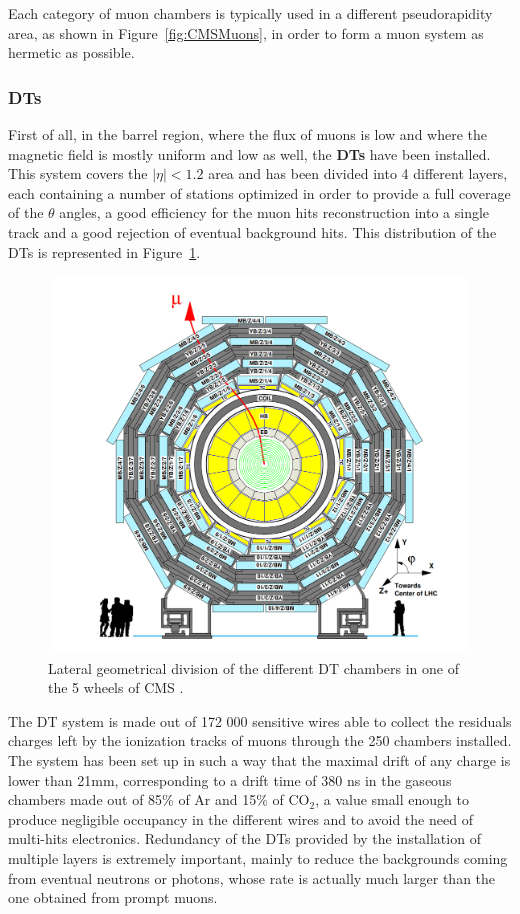 \documentclass[a4paper, 10pt, openright]{report}
\begin{document}
Each category of muon chambers is typically used in a different pseudorapidity area, as shown in Figure~\ref{fig:CMSMuons}, in order to form a muon system as hermetic as possible.

\subsubsection*{\acfp{DT}}

First of all, in the barrel region, where the flux of muons is low and where the magnetic field is mostly uniform and low as well, the \textbf{\acp{DT}} have been installed. This system covers the $|\eta| < 1.2$ area and has been divided into 4 different layers, each containing a number of stations optimized in order to provide a full coverage of the $\theta$ angles, a good efficiency for the muon hits reconstruction into a single track and a good rejection of eventual background hits. This distribution of the \acp{DT} is represented in Figure~\ref{fig:CMSDT}.

\begin{figure}[htbp]
\begin{center}
\includegraphics[width=12cm, height=10cm]{figs/CMSDT.png}
\caption{Lateral geometrical division of the different \ac{DT} chambers in one of the 5 wheels of \ac{CMS} \cite{CMSDescription}.}
\label{fig:CMSDT}
\end{center}
\end{figure}

The \ac{DT} system is made out of 172 000 sensitive wires able to collect the residuals charges left by the ionization tracks of muons through the 250 chambers installed. The system has been set up in such a way that the maximal drift of any charge is lower than 21mm, corresponding to a drift time of 380 ns in the gaseous chambers made out of 85\% of Ar and 15\% of CO$_2$, a value small enough to produce negligible occupancy in the different wires and to avoid the need of multi-hits electronics. Redundancy of the \acp{DT} provided by the installation of multiple layers is extremely important, mainly to reduce the backgrounds coming from eventual neutrons or photons, whose rate is actually much larger than the one obtained from prompt muons.
\end{document}
